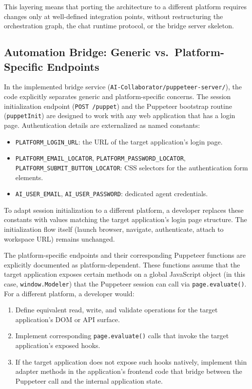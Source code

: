 This layering means that porting the architecture to a different platform requires changes only at well-defined integration points, without restructuring the orchestration graph, the chat runtime protocol, or the bridge server skeleton.

\subsection{Automation Bridge: Generic vs.\ Platform-Specific Endpoints}
In the implemented bridge service (\texttt{AI-Collaborator/puppeteer-server/}), the code explicitly separates generic and platform-specific concerns. The session initialization endpoint (\texttt{POST /puppet}) and the Puppeteer bootstrap routine (\texttt{puppetInit}) are designed to work with any web application that has a login page. Authentication details are externalized as named constants:

\begin{itemize}
    \item \texttt{PLATFORM\_LOGIN\_URL}: the URL of the target application's login page.
    \item \texttt{PLATFORM\_EMAIL\_LOCATOR}, \texttt{PLATFORM\_PASSWORD\_LOCATOR},\\
    \texttt{PLATFORM\_SUBMIT\_BUTTON\_LOCATOR}: CSS selectors for the authentication form elements.
    \item \texttt{AI\_USER\_EMAIL}, \texttt{AI\_USER\_PASSWORD}: dedicated agent credentials.
\end{itemize}

To adapt session initialization to a different platform, a developer replaces these constants with values matching the target application's login page structure. The initialization flow itself (launch browser, navigate, authenticate, attach to workspace URL) remains unchanged.

The platform-specific endpoints and their corresponding Puppeteer functions are explicitly documented as platform-dependent. These functions assume that the target application exposes certain methods on a global JavaScript object (in this case, \texttt{window.Modeler}) that the Puppeteer session can call via \texttt{page.evaluate()}. For a different platform, a developer would:

\begin{enumerate}
    \item Define equivalent read, write, and validate operations for the target application's DOM or API surface.
    \item Implement corresponding \texttt{page.evaluate()} calls that invoke the target application's exposed hooks.
    \item If the target application does not expose such hooks natively, implement thin adapter methods in the application's frontend code that bridge between the Puppeteer call and the internal application state.
\end{enumerate}

